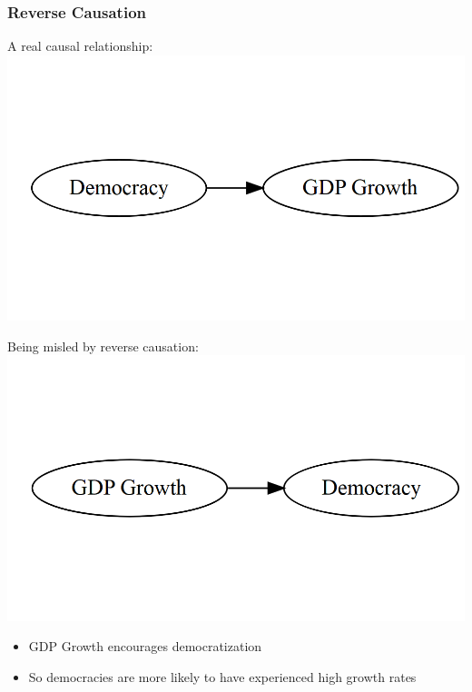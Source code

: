 \documentclass[xcolor=x11names,compress]{beamer}\usepackage[]{graphicx}\usepackage[]{xcolor}
\makeatletter
\def\maxwidth{ %
  \ifdim\Gin@nat@width>\linewidth
    \linewidth
  \else
    \Gin@nat@width
  \fi
}
\newenvironment{knitrout}{}{} %
\renewcommand{\(}{\begin{columns}}
\renewcommand{\)}{\end{columns}}
\newcommand{\<}[1]{\begin{column}{#1}}
\renewcommand{\>}{\end{column}}
\makeatother
\begin{document}
\begin{frame}
\frametitle{Reverse Causation}
\begin{multicols}{2}
A real causal relationship:
\begin{knitrout}
\color{fgcolor}
\includegraphics[width=\maxwidth]{figure/reverse1-1} 
\end{knitrout}
\columnbreak

Being misled by reverse causation:
\begin{knitrout}
\color{fgcolor}
\includegraphics[width=\maxwidth]{figure/reverse2-1} 
\end{knitrout}
\end{multicols}
\begin{itemize}
\pause
\item GDP Growth encourages democratization
\pause
\item So democracies are more likely to have experienced high growth rates
\end{itemize}
\end{frame}
\end{document}
